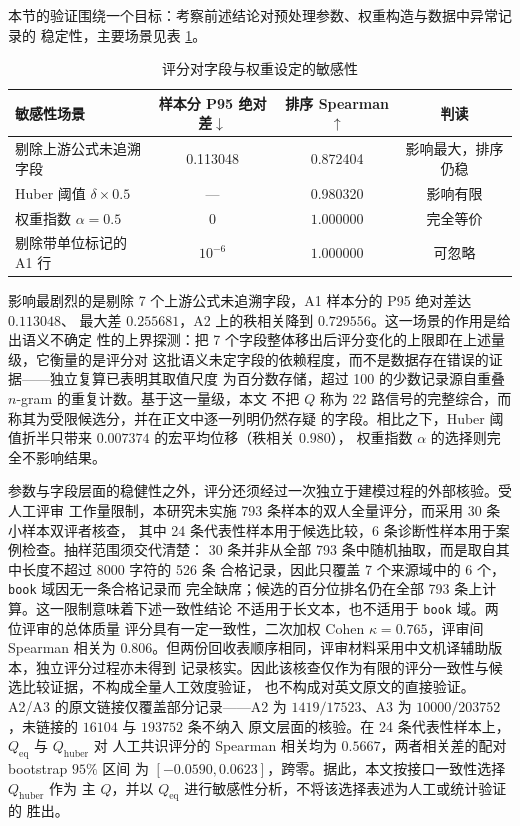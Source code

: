 \documentclass[bwprint]{gmcmthesis}
\numberwithin{equation}{section}
\numberwithin{figure}{section}
\numberwithin{table}{section}
\begin{document}
本节的验证围绕一个目标：考察前述结论对预处理参数、权重构造与数据中异常记录的
稳定性，主要场景见表 \ref{tab:q1-sens}。

\begin{table}[htp!]
\centering
\renewcommand\arraystretch{1.2}
\caption{评分对字段与权重设定的敏感性}\label{tab:q1-sens}
\begin{tabular*}{\textwidth}{@{\extracolsep{\fill}}lccc@{}}
\toprule
敏感性场景 & 样本分 P95 绝对差$\downarrow$ & 排序 Spearman$\uparrow$ & 判读 \\
\midrule
剔除上游公式未追溯字段 & 0.113048 & 0.872404 & 影响最大，排序仍稳 \\
Huber 阈值 $\delta\times0.5$ & --- & 0.980320 & 影响有限 \\
权重指数 $\alpha=0.5$ & $0$ & $1.000000$ & 完全等价 \\
剔除带单位标记的 A1 行 & $10^{-6}$ & $1.000000$ & 可忽略 \\
\bottomrule
\end{tabular*}
\end{table}

影响最剧烈的是剔除 7 个上游公式未追溯字段，A1 样本分的 P95 绝对差达 $0.113048$、
最大差 $0.255681$，A2 上的秩相关降到 $0.729556$。这一场景的作用是给出语义不确定
性的上界探测：把 7 个字段整体移出后评分变化的上限即在上述量级，它衡量的是评分对
这批语义未定字段的依赖程度，而不是数据存在错误的证据——独立复算已表明其取值尺度
为百分数存储，超过 100 的少数记录源自重叠 $n$-gram 的重复计数。基于这一量级，本文
不把 $Q$ 称为 22 路信号的完整综合，而称其为受限候选分，并在正文中逐一列明仍然存疑
的字段。相比之下，Huber 阈值折半只带来 $0.007374$ 的宏平均位移（秩相关 $0.980$），
权重指数 $\alpha$ 的选择则完全不影响结果。

参数与字段层面的稳健性之外，评分还须经过一次独立于建模过程的外部核验。受人工评审
工作量限制，本研究未实施 793 条样本的双人全量评分，而采用 30 条小样本双评者核查，
其中 24 条代表性样本用于候选比较，6 条诊断性样本用于案例检查。抽样范围须交代清楚：
30 条并非从全部 793 条中随机抽取，而是取自其中长度不超过 8000 字符的 526 条
合格记录，因此只覆盖 7 个来源域中的 6 个，\texttt{book} 域因无一条合格记录而
完全缺席；候选的百分位排名仍在全部 793 条上计算。这一限制意味着下述一致性结论
不适用于长文本，也不适用于 \texttt{book} 域。两位评审的总体质量
评分具有一定一致性，二次加权 Cohen $\kappa=0.765$，评审间 Spearman 相关为
$0.806$。但两份回收表顺序相同，评审材料采用中文机译辅助版本，独立评分过程亦未得到
记录核实。因此该核查仅作为有限的评分一致性与候选比较证据，不构成全量人工效度验证，
也不构成对英文原文的直接验证。A2/A3 的原文链接仅覆盖部分记录——A2 为
$1419/17523$、A3 为 $10000/203752$，未链接的 $16104$ 与 $193752$ 条不纳入
原文层面的核验。在 24 条代表性样本上，$Q_{\mathrm{eq}}$ 与 $Q_{\mathrm{huber}}$ 对
人工共识评分的 Spearman 相关均为 $0.5667$，两者相关差的配对 bootstrap $95\%$ 区间
为 $[-0.0590,0.0623]$，跨零。据此，本文按接口一致性选择 $Q_{\mathrm{huber}}$ 作为
主 $Q$，并以 $Q_{\mathrm{eq}}$ 进行敏感性分析，不将该选择表述为人工或统计验证的
胜出。
\end{document}
